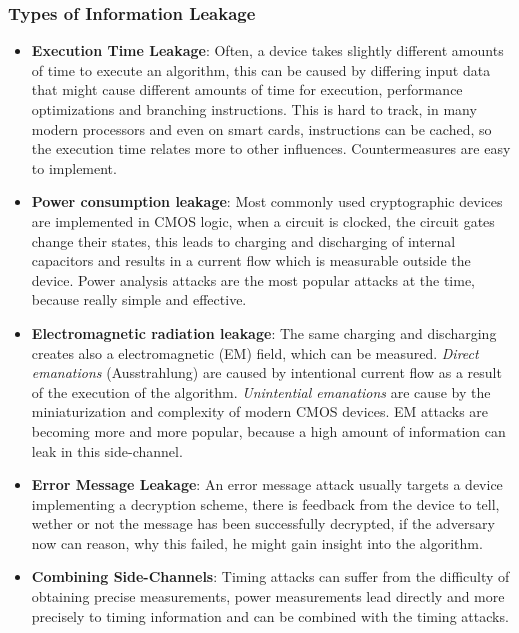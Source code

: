 \documentclass[a4paper, 10 pt, conference]{ieeeconf}
\begin{document}
\subsubsection{\textbf{Types of Information Leakage}}

\begin{itemize}
\item \textbf{Execution Time Leakage}: Often, a device takes slightly different amounts of time to execute an algorithm, this can be caused by differing input data that might cause different amounts of time for execution, performance optimizations and branching instructions. 
This is hard to track, in many modern processors and even on smart cards, instructions can be cached, so the execution time relates more to other influences. Countermeasures are easy to implement. 
\item \textbf{Power consumption leakage}: Most commonly used cryptographic devices are implemented in CMOS logic, when a circuit is clocked, the circuit gates change their states, this leads to charging and discharging of internal capacitors and results in a current flow which is measurable outside the device. Power analysis attacks are the most popular attacks at the time, because really simple and effective. 
\item \textbf{Electromagnetic radiation leakage}: The same charging and discharging creates also a electromagnetic (EM) field, which can be measured. \emph{Direct emanations} (Ausstrahlung) are caused by intentional current flow as a result of the execution of the algorithm. \emph{Unintential emanations} are cause by the miniaturization and complexity of modern CMOS devices. EM attacks are becoming more and more popular, because a high amount of information can leak in this side-channel. 
\item \textbf{Error Message Leakage}: An error message attack usually targets a device implementing a decryption scheme, there is feedback from the device to tell, wether or not the message has been successfully decrypted, if the adversary now can reason, why this failed, he might gain insight into the algorithm. 
\item \textbf{Combining Side-Channels}: Timing attacks can suffer from the difficulty of obtaining precise measurements, power measurements lead directly and more precisely to timing information and can be combined with the timing attacks. 	 
\end{itemize}
\vspace{0.5cm}
\end{document}
